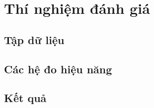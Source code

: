 \chapter{Thí nghiệm đánh giá}
\section{Tập dữ liệu}
\section{Các hệ đo hiệu năng}
\section{Kết quả}
